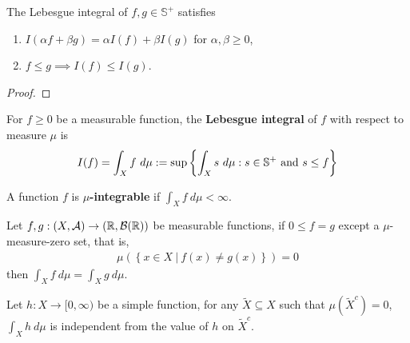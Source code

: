 \documentclass[11pt]{article}
\begin{document}
	\begin{theorem}
		The Lebesgue integral of $f, g \in \mathbb{S}^+$ satisfies
		\begin{enumerate}
			\item $I(\alpha f + \beta g) = \alpha I(f) + \beta I(g)$ for $\alpha, \beta \geq 0$,
			\item $f \leq g \implies I(f) \leq I(g)$.
		\end{enumerate}
	\end{theorem}
	
	\begin{proof}
		
	\end{proof}
	
	\begin{definition}
		For $f \geq 0$ be a measurable function, the \textbf{Lebesgue integral} of $f$ with respect to measure $\mu$ is
		\begin{align}
			I(f) = \int_X f\ d\mu := \sup\left\{\int_X s\ d\mu: s \in \mathbb{S}^+ \text{{ and }} s \leq f \right\}
		\end{align}
	\end{definition}
	
	\begin{definition}
		A function $f$ is \textbf{$\mu$-integrable} if $\int_X f\ d\mu < \infty$.
	\end{definition}
	
	\begin{theorem}\label{thm:1}
		Let $f, g: (X, \mathcal{{A}}) \to (\mathbb{R}, \mathcal{{B}}(\mathbb{R}))$ be measurable functions, if $0 \leq f = g$ except a $\mu$-measure-zero set, that is,
		\begin{align}
			\mu\left(\left\{
				x \in X\ |\ f(x) \neq g(x)
			\right\}\right) = 0
		\end{align}
		then $\int_X f\ d\mu = \int_X g\ d\mu$.
	\end{theorem}
	
	\begin{lemma}\label{lem:1}
		Let $h: X \to [0, \infty)$ be a simple function, for any $\tilde{X} \subseteq X$ such that $\mu(\tilde{X}^c) = 0$, $\int_X h\ d\mu$ is independent from the value of $h$ on $\tilde{X}^c$.
	\end{lemma}
	
\end{document}
